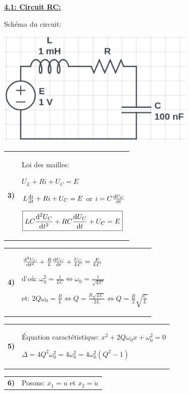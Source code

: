 \documentclass{article}
\newcommand{\question}[2]
{
    \begin{tabularx}{\linewidth}{lX}
        \textbf{#1)} & {#2}
    \end{tabularx} 
}
\newcommand{\expart}[1]
{
    \textbf{\underline{#1:}} \par 
}
\begin{document}
\expart{4.1: Circuit RC}
{
    Schéma du circuit:

    \begin{center}
      \includegraphics[height=15em]{images/rlc_schema.png}
    \end{center}

    \question{3}{
      Loi des mailles:

      $U_L+Ri+U_C=E$

      $L\dv{i}{t}+Ri+U_C=E$ or $i=C\dv{U_C}{t}$
      
      $\boxed{LC\dv[2]{U_C}{t}+RC\dv{U_C}{t}+U_C=E}$
    }

    \question{4}{
      $\dv[2]{U_C}{t}+\frac{R}{L}\dv{U_C}{t}+\frac{U_C}{LC}=\frac{E}{LC}$

      d'où: $\omega_0^2=\frac{1}{LC} \Longleftrightarrow \boxed{\omega_0=\frac{1}{\sqrt{LC}}}$

      et: $2Q\omega_0=\frac{R}{L} \Longleftrightarrow Q=\frac{R\sqrt{LC}}{2L} \Longleftrightarrow \boxed{Q=\frac{R}{2}\sqrt{\frac{C}{L}}}$
    }

    \question{5}{
      Équation caractétistique:
      $x^2+2Q\omega_0x+\omega_0^2=0$

      $\Delta=4Q^2\omega_0^2=4\omega_0^2=4\omega_0^2(Q^2-1)$

      \fbox{\begin{minipage}{1.0\textwidth}
          - \textbf{Apériodique} si: $\Delta>0 \Longleftrightarrow Q^2>1 \Longleftrightarrow Q>1 \Longleftrightarrow R>2\sqrt{\frac{L}{C}}$

          - \textbf{Critique} si: $\Delta=0 \Longleftrightarrow Q=1 \Longleftrightarrow R=2\sqrt{\frac{L}{C}}$

          - \textbf{Pseudo-périodique} si: $\Delta<0 \Longleftrightarrow Q<1 \Longleftrightarrow R<2\sqrt{\frac{L}{C}}$
      \end{minipage}}
    }

    \question{6}{
      Posons: $x_1=u$ et $x_2=\dot{u}$

}}
\end{document}
